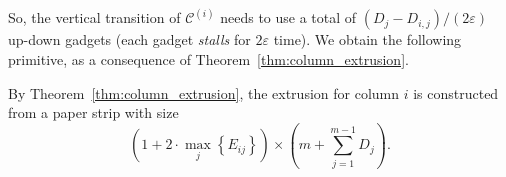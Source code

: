 So, the vertical transition of $\mathcal C^{(i)}$ needs to use a total of $\left( D_j - D_{i,j}\right)/\left( 2\varepsilon\right)$
up-down gadgets (each gadget \emph{stalls} for $2\varepsilon$ time).
We obtain the following primitive, as a consequence of Theorem~\ref{thm:column_extrusion}.

\begin{proposition}
\label{prop:accordion_layers}
By Theorem~\ref{thm:column_extrusion}, the extrusion for column $i$ is constructed from a paper strip with size
$$\left( 1 + 2\cdot\max_j\left\{ E_{ij}\right\}\right)\times \left( m + \sum\limits^{m-1}_{j=1} D_j \right). $$
\end{proposition}
